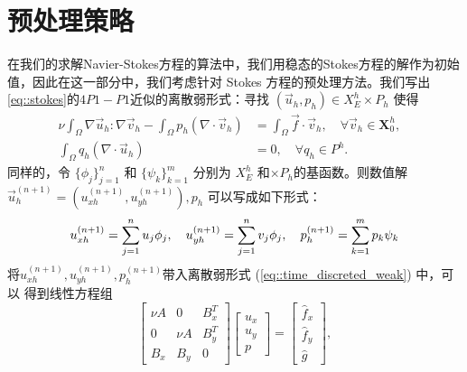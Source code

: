    \section{预处理策略}
      在我们的求解Navier-Stokes方程的算法中，我们用稳态的Stokes方程的解作为初始值，因此在这一部分中，我们考虑针对
      Stokes 方程的预处理方法。我们写出\eqref{eq::stokes}的$4P1-P1$近似的离散弱形式：寻找 $(\vec{u}_h, p_h) \in X_E^h \times P_h$
      使得
       \begin{equation}
         \begin{aligned}
           \nu \int_\Omega \nabla \vec{u}_h : \nabla \vec{v}_h
           - \int_\Omega p_h \left( \nabla \cdot \vec{v}_h
           \right) & = \int_\Omega \vec{f} \cdot \vec{v}_h, \quad
           \forall \vec{v}_h \in \mathbf{X}_0^h,&  \\
           \int_\Omega q_h \left( \nabla \cdot \vec{u}_h \right) & = 0,
           \quad \forall q_h \in P^h.&
           \label{eq::discreted_weak_stokes}
         \end{aligned}
       \end{equation}
      同样的，令 $\{\phi_j \}_{j = 1}^n$ 和 $\{\psi_k\}_{k = 1}^m$ 分别为 $X_E^h$ 和$\times P_h$的基函数。则数值解
      $\vec{u}_h^{(n + 1)} = (u_{xh}^{(n + 1)}, u_{yh}^{(n + 1)}), p_h$ 可以写成如下形式：
      \begin{equation}
         u_{xh}^{(n + 1)} = \sum_{j = 1}^n u_j \phi_j, \quad u_{yh}^{(n +
         1)} = \sum_{j = 1}^n v_j \phi_j, \quad p_h^{(n + 1)} = \sum_{k
         = 1}^m p_k \psi_k \notag
      \end{equation}
      将$u_{xh}^{(n + 1)}, u_{yh}^{(n + 1)}, p_h^{(n + 1)}$带入离散弱形式
      (\ref{eq::time_discreted_weak}) 中，可以
      得到线性方程组
       \begin{equation}
         \left[
           \begin{array}{lll}
             \nu A & 0 & B_x^T \\
             0 & \nu A  & B_y^T \\
             B_x & B_y & 0
           \end{array}
         \right]
         \left[
           \begin{array}{c}
              u_x \\
              u_y \\
              p
           \end{array}
         \right] =
         \left[
           \begin{array}{c}
             \hat{f}_x \\
             \hat{f}_y \\
             \hat{g}
           \end{array}
         \right],
         \label{eq::linear_system_stokes}
       \end{equation}
